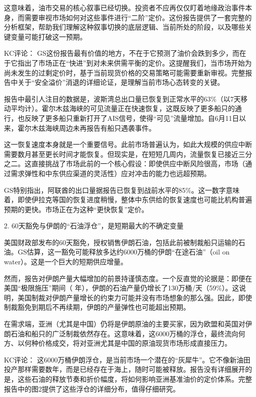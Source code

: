 \documentclass[11pt]{ctexart}
\begin{document}
这意味着，油市交易的核心叙事已经切换。投资者不应再仅仅盯着地缘政治事件本身，而需要审视市场如何对这些事件进行“二阶”定价。这份报告提供了一套完整的分析框架，帮助我们理解这种叙事切换的底层逻辑、当前所处的阶段，以及哪些关键变量可能打破这一预期。

KC评论： GS这份报告最有价值的地方，不在于它预测了油价会跌到多少，而在于它指出了市场正在“快进”到对未来供需平衡的定价。这提醒我们，当市场开始为尚未发生的过剩定价时，基于当前现货价格的交易策略可能需要重新审视。完整报告中关于“安全溢价”消退的详细论证，是理解当前市场心态转变的关键。

报告中最引人注目的数据是，波斯湾总出口量已恢复到正常水平的63\%（以7天移动平均计）。霍尔木兹海峡的可见流量正在快速恢复，这既反映了更多船只的通行，也反映了更多船只重新打开了AIS信号，使得“可见”流量增加。自6月11日以来，霍尔木兹海峡周边未再报告有船只遇袭事件。

这一恢复速度本身就是一个重要信号。此前市场普遍认为，如此大规模的供应中断需要数月甚至更长时间才能恢复。但现实是，在短短几周内，流量恢复已接近三分之二。这直接挑战了市场此前的一个核心假设：即使供应中断风险很高，市场（通过需求弹性和中东供应渠道的灵活性）应对冲击的能力也远超预期。

GS特别指出，阿联酋的出口量据报告已恢复到战前水平的85\%。这一数字意味着，即使伊拉克等国的恢复进度稍慢，整体中东供给的恢复速度也可能比机构普遍预期的更快。市场正在为这种“更快恢复”定价。

2. 60天豁免与伊朗的“石油浮仓”，是短期最大的不确定变量

美国财政部发布的60天豁免，授权销售伊朗石油，包括此前被制裁船只运输的石油。GS估算，这一豁免可能释放多达约6000万桶的伊朗“在途石油”（oil on water）。这是一个巨大的短期供应增量。

然而，报告对伊朗产量大幅增加的前景持谨慎态度。一个反直觉的论据是：即便在美国“极限施压”期间（ 年），伊朗的石油产量仍增长了130万桶/天（59\%）。这说明，美国制裁对伊朗产量增长的约束力可能并没有市场想象的那么强。因此，即使制裁豁免到期后不再续期，伊朗的产量弹性也可能超出预期。

在需求端，亚洲（尤其是中国）仍将是伊朗原油的主要买家，因为欧盟和英国对伊朗石油和船只的广泛制裁依然存在。这意味着，这6000万桶的浮仓，最终流向何方、以何种价格成交，将对亚洲尤其是中国的原油现货市场形成直接压力。

KC评论： 这6000万桶伊朗浮仓，是当前市场一个潜在的“灰犀牛”。它不像新油田投产那样需要数年，而是已经存在于海上，随时可能被释放。报告没有详细展开的是，这些石油的释放节奏和折价幅度，将如何影响亚洲基准油价的定价体系。完整报告中的图2提供了这些浮仓的详细分布，值得仔细研究。
\end{document}
